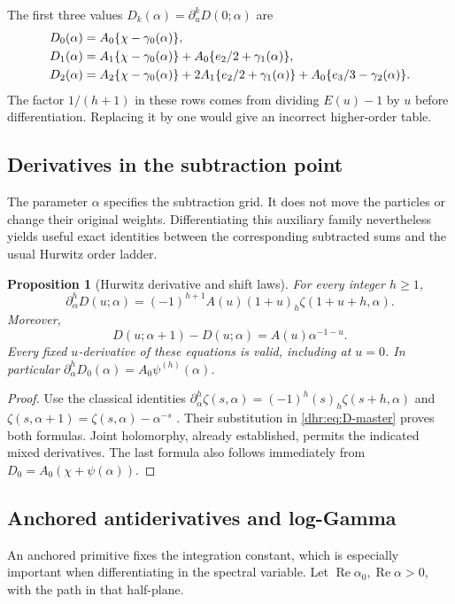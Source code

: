 \documentclass[11pt,letterpaper]{article}
\numberwithin{equation}{section}
\newtheorem{proposition}[theorem]{Proposition}
\theoremstyle{definition}\newtheorem{definition}[theorem]{Definition}
\theoremstyle{remark}\newtheorem{remark}[theorem]{Remark}
\DeclareMathOperator{\Rea}{Re}
\begin{document}
The first three values $D_k(\alpha)=\partial_u^kD(0;\alpha)$ are
\begin{align}
 D_0(\alpha)&=A_0\{\chi-\gamma_0(\alpha)\},\notag\\
 D_1(\alpha)&=A_1\{\chi-\gamma_0(\alpha)\}
                   +A_0\{e_2/2+\gamma_1(\alpha)\},\notag\\
 D_2(\alpha)&=A_2\{\chi-\gamma_0(\alpha)\}
          +2A_1\{e_2/2+\gamma_1(\alpha)\}
          +A_0\{e_3/3-\gamma_2(\alpha)\}.
 \label{dhr:eq:first-jets}
\end{align}
The factor $1/(h+1)$ in these rows comes from dividing $E(u)-1$ by
$u$ before differentiation. Replacing it by one would give an
incorrect higher-order table.

\subsection{Derivatives in the subtraction point}
The parameter $\alpha$ specifies the subtraction grid. It does not
move the particles or change their original weights. Differentiating
this auxiliary family nevertheless yields useful exact identities
between the corresponding subtracted sums and the usual Hurwitz
order ladder.

\begin{proposition}[Hurwitz derivative and shift laws]\label{dhr:prop:alpha}
For every integer $h\geq1$,
\begin{equation}\label{dhr:eq:alpha-derivative}
 \partial_\alpha^hD(u;\alpha)
 =(-1)^{h+1}A(u)(1+u)_h\zeta(1+u+h,\alpha).
\end{equation}
Moreover,
\begin{equation}\label{dhr:eq:alpha-shift}
 D(u;\alpha+1)-D(u;\alpha)=A(u)\alpha^{-1-u}.
\end{equation}
Every fixed $u$-derivative of these equations is valid, including
at $u=0$. In particular
$\partial_\alpha^hD_0(\alpha)=A_0\psi^{(h)}(\alpha)$.
\end{proposition}
\begin{proof}
Use the classical identities
$\partial_\alpha^h\zeta(s,\alpha)=(-1)^h(s)_h\zeta(s+h,\alpha)$
and $\zeta(s,\alpha+1)=\zeta(s,\alpha)-\alpha^{-s}$
\cite{dlmf:hurwitz}. Their substitution in
\eqref{dhr:eq:D-master} proves both formulas. Joint holomorphy, already
established, permits the indicated mixed derivatives. The last formula
also follows immediately from $D_0=A_0(\chi+\psi(\alpha))$.
\end{proof}

\subsection{Anchored antiderivatives and log-Gamma}
An anchored primitive fixes the integration constant, which is especially
important when differentiating in the spectral variable. Let
$\Rea\alpha_0,\Rea\alpha>0$, with the path in that half-plane.
\end{document}
